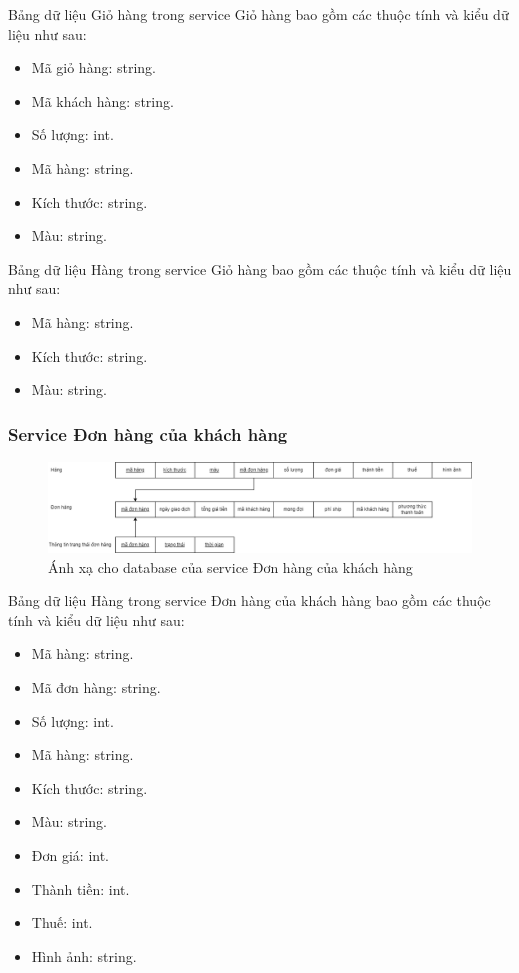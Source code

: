 Bảng dữ liệu Giỏ hàng trong service Giỏ hàng bao gồm các thuộc tính và kiểu dữ liệu như sau:
\begin{itemize}
    \item Mã giỏ hàng: string.
    \item Mã khách hàng: string.
    \item Số lượng: int.
    \item Mã hàng: string.
    \item Kích thước: string.
    \item Màu: string.
\end{itemize}

Bảng dữ liệu Hàng trong service Giỏ hàng bao gồm các thuộc tính và kiểu dữ liệu như sau:
\begin{itemize}
    \item Mã hàng: string.
    \item Kích thước: string.
    \item Màu: string.
\end{itemize}

\subsubsection{Service Đơn hàng của khách hàng}
\begin{figure}[!htp]
    \begin{center}
        \includegraphics[width=1\textwidth]{img/database/mapping/mapping-customer-order.png}
        \newline
        \caption{Ánh xạ cho database của service Đơn hàng của khách hàng}
    \end{center}
\end{figure}

Bảng dữ liệu Hàng trong service Đơn hàng của khách hàng bao gồm các thuộc tính và kiểu dữ liệu như sau:
\begin{itemize}
    \item Mã hàng: string.
    \item Mã đơn hàng: string.
    \item Số lượng: int.
    \item Mã hàng: string.
    \item Kích thước: string.
    \item Màu: string.
    \item Đơn giá: int.
    \item Thành tiền: int.
    \item Thuế: int.
    \item Hình ảnh: string.
\end{itemize}

